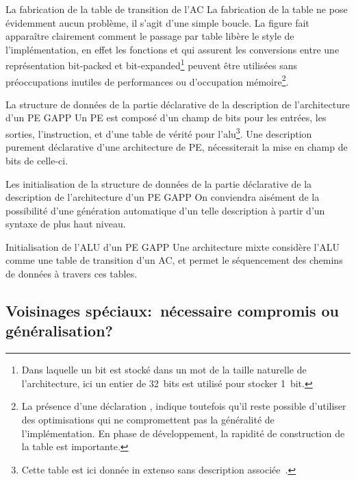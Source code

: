 %
{}%
{La fabrication de la table de transition de l'AC }%
{La fabrication de la table ne pose évidemment aucun problème, il
  s'agit d'une simple boucle. %
  La figure fait apparaître clairement comment le passage par table
  libère le style de l'implémentation, en effet les fonctions
   et  qui assurent les conversions entre une
  représentation bit-packed et bit-expanded\footnote{%
    Dans laquelle un bit est stocké dans un mot de la taille naturelle
    de l'architecture, ici un entier de 32~bits est utilisé pour
    stocker 1~bit.} %
  peuvent être utilisées sans préoccupations inu\-tiles de
  performances ou d'occupation mémoire\footnote{%
    La présence d'une déclaration , indique toutefois
    qu'il reste possible d'utiliser des optimisations qui ne
    compromettent pas la généralité de l'implémentation. %
    En phase de développement, la rapidité de construction de la table
    est importante.}.}

%
{}%
{La structure de données de la partie déclarative de la description de
  l'architecture d'un PE GAPP}%
{Un PE est composé d'un champ de bits pour les entrées, les sorties,
  l'instruction, et d'une table de vérité pour l'alu\footnote{%
    Cette table est ici donnée in extenso sans description
    associée~.}. %
  Une description purement déclarative d'une architecture de PE,
  nécessiterait la mise en champ de bits de celle-ci.}

%
{}%
{Les initialisation de la structure de données de la partie déclarative
  de la description de l'architecture d'un PE GAPP}%
{On conviendra aisément de la possibilité d'une génération
  automatique d'un telle description à partir d'un syntaxe de plus
  haut niveau.}

%
{}%
{Initialisation de l'ALU d'un PE GAPP}%
{Une architecture mixte  considère l'ALU comme
  une table de transition d'un AC, et permet le séquencement des
  chemins de données à travers ces tables.}

\subsection{Voisinages spéciaux:~nécessaire compromis ou généra\-lisation?}

